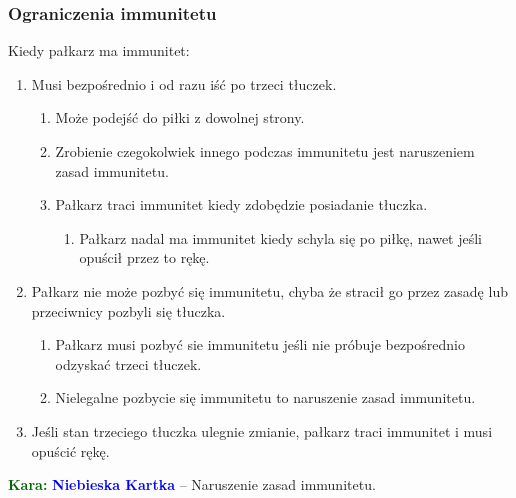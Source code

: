 \documentclass[11pt,a4paper]{article}
\newcommand\bluecard[1]{\bgroup\textcolor{darkgreen}{\textbf{Kara: }}\bgroup\textcolor{blue}{\textbf{Niebieska Kartka}} -- #1}
\begin{document}
\subsubsection{Ograniczenia immunitetu}
Kiedy pałkarz ma immunitet:
\begin{enumerate}
  \item Musi bezpośrednio i od razu iść po trzeci tłuczek.
  \begin{enumerate}
    \item Może podejść do piłki z dowolnej strony.
    \item Zrobienie czegokolwiek innego podczas immunitetu jest naruszeniem zasad immunitetu.
    \item Pałkarz traci immunitet kiedy zdobędzie posiadanie tłuczka.
    \begin{enumerate}
      \item Pałkarz nadal ma immunitet kiedy schyla się po piłkę, nawet jeśli opuścił przez to rękę.
    \end{enumerate}
  \end{enumerate}
  \item Pałkarz nie może pozbyć się immunitetu, chyba że stracił go przez zasadę lub przeciwnicy pozbyli się tłuczka.
  \begin{enumerate}
    \item Pałkarz musi pozbyć sie immunitetu jeśli nie próbuje bezpośrednio odzyskać trzeci tłuczek.
    \item Nielegalne pozbycie się immunitetu to naruszenie zasad immunitetu.
  \end{enumerate}
  \item Jeśli stan trzeciego tłuczka ulegnie zmianie, pałkarz traci immunitet i musi opuścić rękę.
\end{enumerate}

\bluecard{Naruszenie zasad immunitetu.}

%
%
%
%
%
%

\newpage
\end{document}

